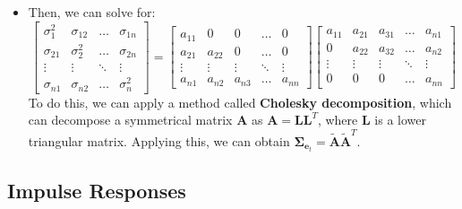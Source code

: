 \documentclass[notitlepage]{article}
\begin{document}
\begin{itemize}
\begin{itemize}
        \item This form is called a \textbf{recursive VAR}.
        \item The order is usually implied by theory or observations. For example, consider monetary policy: We may assume inflation \(\pi_t\) is given exogenously, unemployment \(u_t\) is affected by it by the Phillips curve, and finally interest rate \(i_t\) is determined by both of these through Taylor rule.
    \end{itemize}
    \item Then, we can solve for:
    \[
    \begin{bmatrix}
        \sigma_1^2 & \sigma_{12} & \dots & \sigma_{1n} \\ \sigma_{21} & \sigma_2^2 & \dots & \sigma_{2n} \\
        \vdots & \vdots & \ddots & \vdots \\
        \sigma_{n1} & \sigma_{n2} & \dots & \sigma_n^2
    \end{bmatrix} =
    \begin{bmatrix}
        a_{11} & 0 & 0 & \dots & 0 \\ a_{21} & a_{22} & 0 & \dots & 0 \\ \vdots & \vdots & \vdots & \ddots & \vdots \\ a_{n1} & a_{n2} & a_{n3} & \dots & a_{nn}
    \end{bmatrix}
    \begin{bmatrix}
        a_{11} & a_{21} & a_{31} & \dots & a_{n1} \\ 0 & a_{22} & a_{32} & \dots & a_{n2} \\ \vdots & \vdots & \vdots & \ddots & \vdots \\ 0 & 0 & 0 & \dots & a_{nn}
    \end{bmatrix}
    \]
    To do this, we can apply a method called \textbf{Cholesky decomposition}, which can decompose a symmetrical matrix \(\mathbf{A}\) as \(\mathbf{A}= \mathbf{L}\mathbf{L}^T\), where \(\mathbf{L}\) is a lower triangular matrix. Applying this, we can obtain \(\boldsymbol{\Sigma}_{\mathbf{e}_t} = \tilde{\mathbf{A}}\tilde{\mathbf{A}}^T\).
\end{itemize} 

\subsection{Impulse Responses}
\end{document}

